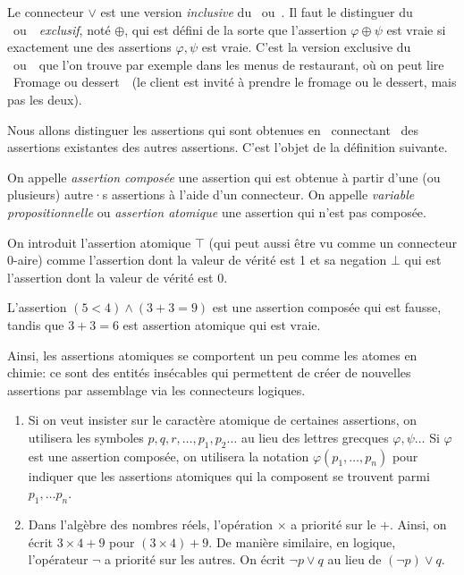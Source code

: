 \documentclass[french,course,oneside,theoremnosection]{lecture}
\begin{document}
\begin{remark}
Le connecteur $\vee$ est une version \emph{inclusive} du \og~ou~\fg{}. Il faut le distinguer du \og~ou~\fg{}~\emph{exclusif}, noté $\oplus$, qui est défini de la sorte que l'assertion $\varphi \oplus \psi$ est vraie si exactement une des assertions $\varphi,  \psi$ est vraie. C'est la version exclusive du  \og~ou~\fg{}~que l'on trouve par exemple dans les menus de restaurant, où on peut lire \og~Fromage ou dessert~\fg{}~(le client est invité à prendre le fromage ou le dessert, mais pas les deux).
\end{remark}

Nous allons distinguer les assertions qui sont obtenues en \og~connectant~\fg{} des assertions existantes des autres assertions. C'est l'objet de la définition suivante.

\begin{definition}
On appelle \emph{assertion composée} une assertion qui est obtenue à partir d'une (ou plusieurs) autre·s assertions à l'aide d'un connecteur.
On appelle \emph{variable propositionnelle} ou \emph{assertion atomique} une assertion qui n'est pas composée.~

On introduit l'assertion atomique $\top$ (qui peut aussi être vu comme un connecteur $0$-aire) comme l'assertion dont la valeur de vérité est 1 et sa negation $\bot$ qui est l'assertion dont la valeur de vérité est 0. 
\end{definition}

\begin{example}
L'assertion $(5<4) \wedge (3+3=9)$ est une assertion composée qui est fausse, tandis que $3+3=6$ est assertion atomique qui est vraie.
\end{example}

Ainsi, les assertions atomiques se comportent un peu comme les atomes en chimie: ce sont des entités insécables qui permettent de créer de nouvelles assertions par assemblage via les connecteurs logiques.

\begin{notation}
\begin{enumerate}[(1)]
\item Si on veut insister sur le caractère atomique de certaines assertions, on utilisera les symboles $p, q, r, \ldots, p_1, p_2\ldots$ au lieu des lettres grecques $\varphi, \psi\ldots$ Si $\varphi$ est une assertion composée, on utilisera la notation $\varphi(p_1, \ldots, p_n)$ pour indiquer que les assertions atomiques qui la composent se trouvent parmi $p_1, \ldots p_n$.
\item Dans l'algèbre des nombres réels, l'opération $\times$ a priorité sur le $+$. Ainsi, on écrit $3\times 4 +9$ pour $(3\times 4) +9$. De manière similaire, en logique, l'opérateur $\neg$ a priorité sur les autres. On écrit $\neg p  \vee q$ au lieu de $(\neg p) \vee q$.
\end{enumerate}

\end{notation}
\end{document}

